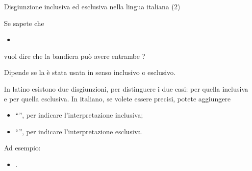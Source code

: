 \documentclass[aspectratio=169,10pt,dvipsnames,handout]{beamer}
\begin{document}
\begin{frame}{Disgiunzione inclusiva ed esclusiva nella lingua italiana (2)}
    \begin{example}
        Se sapete che
        \begin{itemize}
            \item {}
        \end{itemize}
        vuol dire che la bandiera può avere entrambe ?
    \end{example}

    \pause
    \medskip
    Dipende se la  è stata usata in senso inclusivo o esclusivo.

    \smallskip
    In latino esistono due disgiunzioni, per distinguere i due casi:  per quella inclusiva e  per quella esclusiva. In italiano, se volete essere precisi, potete aggiungere
    \begin{itemize}
        \item ``'', per indicare l'interpretazione inclusiva;
        \item ``'', per indicare l'interpretazione esclusiva.
    \end{itemize}
    Ad esempio:
    \begin{itemize}
        \item {}.
    \end{itemize}
\end{frame}
\end{document}
